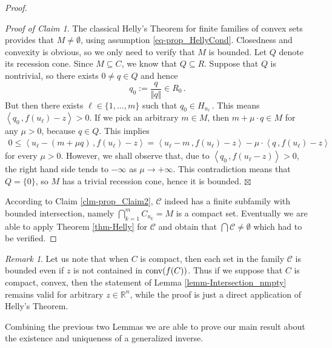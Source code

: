 \documentclass[12pt]{amsart}
\theoremstyle{remark}
\newtheorem{remark}{Remark}%
\newtheorem{prclm}{Proof of Claim}[section]
\theoremstyle{definition}
\newcommand{\Rn}{\mathbb{R}^n}
\newcommand{\nma}{\Vert}
\newcommand{\conv}{\mbox{\rm conv}}
\newcommand{\bsz}[2]{\left \langle #1 \,, #2 \right \rangle}
\begin{document}
\begin{proof}
\begin{prclm}
The classical Helly's Theorem for finite families 
of convex sets provides that $ M \neq \emptyset $, 
using assumption \eqref{eq-prop_HellyCond}. 
Closedness and convexity is obvious, so we only need 
to verify that $ M $ is bounded. Let $ Q $ denote its 
recession cone. Since $ M \subseteq C $, we know that 
$ Q \subseteq R $. 
Suppose that $ Q $ is nontrivial, so there exists 
$ 0 \neq q \in Q $ and hence 
\[ 
q_0 := \frac{q}{\nma q \nma} \in R_0 \,. 
\] 
But then there exists 
$ \ell \in \{ 1, \dots , m \} $ such that 
$ q_0 \in H_{u_\ell} \,$. This means 
$ \bsz{q_0}{f(u_{\ell}) - z} > 0 $. 
If we pick an arbitrary $ m \in M $, then 
$ m + \mu \cdot q \in M $ for any $ \mu > 0 $, because 
$ q \in Q $. This implies 
\begin{align*}
0  \leq \bsz{u_{\ell}- \left( m + \mu q \right)}{f(u_{\ell}) - z} 
= \bsz{u_{\ell}-m}{f(u_{\ell}) - z} - 
\mu \cdot \bsz{q}{f(u_{\ell}) - z} 
\end{align*} 
for every $ \mu > 0 $. 
However, we shall observe that, 
due to $ \bsz{q_0}{f(u_{\ell} - z)} > 0 $, 
the right hand side tends to $ - \infty $ 
as $ \mu \to + \infty $. This contradiction means that 
$ Q = \{ 0 \} $, so $ M $ has a trivial recession cone, 
hence it is bounded. 
\flushright 
$ \boxtimes $ 
\end{prclm}
According to Claim \ref{clm-prop_Claim2}, $ \mathcal{C} $ 
indeed has a finite subfamily with bounded intersection, 
namely $ \bigcap_{k=1}^{m} C_{u_k} = M $ is a compact set. 
Eventually we are able to apply Theorem \ref{thm-Helly} for 
$ \mathcal{C} $ and obtain that 
$ \bigcap \mathcal{C} \neq \emptyset $ 
which had to be verified. 
\end{proof}

\begin{remark}\label{rem-Lemma_Compact}
Let us note that when $ C $ is 
compact, then each set in the family 
$ \mathcal{C} $ is bounded even if 
$ z $ is not contained in $ \conv (f(C)) $. 
Thus if we suppose that $ C $ is compact, convex, then 
the statement of Lemma \ref{lemm-Intersection_nmpty} 
remains valid 
for arbitrary $ z \in \Rn $, while the proof is just 
a direct application of Helly's Theorem. 
\end{remark}

Combining the previous two Lemmas 
we are able to prove our main result about 
the existence and uniqueness of a generalized inverse. 
\end{document}
